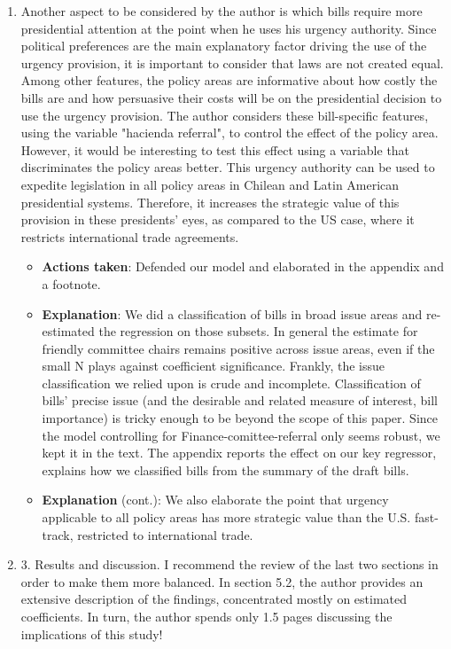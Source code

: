 \documentclass[article,letterpaper,times,12pt,listings-bw,microtype]{article}
\begin{document}
\begin{enumerate}
\begin{itemize}
\end{itemize}
\item Another aspect to be considered by the author is which bills require more presidential attention at the point when he uses his urgency authority. Since political preferences are the main explanatory factor driving the use of the urgency provision, it is important to consider that laws are not created equal. Among other features, the policy areas are informative about how costly the bills are and how persuasive their costs will be on the presidential decision to use the urgency provision. The author considers these bill-specific features, using the variable "hacienda referral", to control the effect of the policy area. However, it would be interesting to test this effect using a variable that discriminates the policy areas better.  This urgency authority can be used to expedite legislation in all policy areas in Chilean and Latin American presidential systems. Therefore, it increases the strategic value of this provision in these presidents' eyes, as compared to the US case, where it restricts international trade agreements.
\label{sec:org315e69e}
\begin{itemize}
\item \textbf{Actions taken}: Defended our model and elaborated in the appendix and a footnote.
\item \textbf{Explanation}: We did a classification of bills in broad issue areas and re-estimated the regression on those subsets. In general the estimate for friendly committee chairs remains positive across issue areas, even if the small N plays against coefficient significance. Frankly, the issue classification we relied upon is crude and incomplete. Classification of bills' precise issue (and the desirable and related measure of interest, bill importance) is tricky enough to be beyond the scope of this paper. Since the model controlling for Finance-comittee-referral only seems robust, we kept it in the text. The appendix reports the effect on our key regressor, explains how we classified bills from the summary of the draft bills.
\item \textbf{Explanation} (cont.): We also elaborate the point that urgency applicable to all policy areas has more strategic value than the U.S. fast-track, restricted to international trade.
\end{itemize}
\item 3. Results and discussion. I recommend the review of the last two sections in order to make them more balanced. In section 5.2, the author provides an extensive description of the findings, concentrated mostly on estimated coefficients. In turn, the author spends only 1.5 pages discussing the implications of this study!

\end{enumerate}
\end{document}
